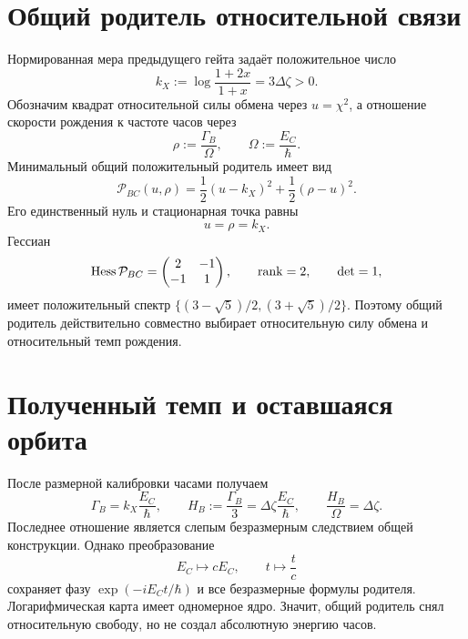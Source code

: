 \section{Общий родитель относительной связи}

Нормированная мера предыдущего гейта задаёт положительное число
\begin{equation}
 k_X:=\log\frac{1+2x}{1+x}=3\Delta\zeta>0.
 \label{eq:v10-clock-growth-coupling}
\end{equation}
Обозначим квадрат относительной силы обмена через $u=\chi^2$, а отношение
скорости рождения к частоте часов через
\begin{equation}
 \rho:=\frac{\Gamma_B}{\Omega},
 \qquad \Omega:=\frac{E_C}{\hbar}.
\end{equation}
Минимальный общий положительный родитель имеет вид
\begin{equation}
 \mathcal P_{BC}(u,\rho)
 =\frac12(u-k_X)^2+\frac12(\rho-u)^2.
 \label{eq:v10-clock-common-parent}
\end{equation}
Его единственный нуль и стационарная точка равны
\begin{equation}
 u=\rho=k_X.
 \label{eq:v10-clock-selected-point}
\end{equation}
Гессиан
\begin{equation}
 \operatorname{Hess}\mathcal P_{BC}
 =\begin{pmatrix}2&-1\\-1&1\end{pmatrix},
 \qquad \operatorname{rank}=2,
 \qquad \det=1,
 \label{eq:v10-clock-parent-hessian}
\end{equation}
имеет положительный спектр
$\{(3-\sqrt5)/2,(3+\sqrt5)/2\}$. Поэтому общий родитель действительно
совместно выбирает относительную силу обмена и относительный темп рождения.

\section{Полученный темп и оставшаяся орбита}

После размерной калибровки часами получаем
\begin{equation}
 \Gamma_B=k_X\frac{E_C}{\hbar},
 \qquad
 H_B:=\frac{\Gamma_B}{3}
 =\Delta\zeta\frac{E_C}{\hbar},
 \qquad
 \frac{H_B}{\Omega}=\Delta\zeta.
 \label{eq:v10-clock-relative-growth}
\end{equation}
Последнее отношение является слепым безразмерным следствием общей
конструкции. Однако преобразование
\begin{equation}
 E_C\longmapsto cE_C,
 \qquad t\longmapsto\frac{t}{c}
 \label{eq:v10-clock-scale-orbit}
\end{equation}
сохраняет фазу $\exp(-iE_Ct/\hbar)$ и все безразмерные формулы родителя.
Логарифмическая карта имеет одномерное ядро. Значит, общий родитель снял
относительную свободу, но не создал абсолютную энергию часов.

